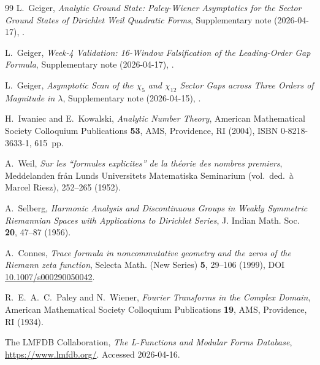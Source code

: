 \documentclass[10pt,twocolumn]{article}
\theoremstyle{definition}
\theoremstyle{remark}
\begin{document}
\begin{thebibliography}{99}
L.~Geiger,
\textit{Analytic Ground State: Paley-Wiener Asymptotics for the
Sector Ground States of Dirichlet Weil Quadratic Forms},
Supplementary note (2026-04-17),
.

L.~Geiger,
\textit{Week-4 Validation: 16-Window Falsification of the
Leading-Order Gap Formula},
Supplementary note (2026-04-17),
.

L.~Geiger,
\textit{Asymptotic Scan of the $\chi_5$ and $\chi_{12}$ Sector Gaps
across Three Orders of Magnitude in $\lambda$},
Supplementary note (2026-04-15),
.


H.~Iwaniec and E.~Kowalski,
\textit{Analytic Number Theory},
American Mathematical Society Colloquium Publications \textbf{53},
AMS, Providence, RI (2004), ISBN 0-8218-3633-1, 615~pp.

A.~Weil,
\textit{Sur les ``formules explicites'' de la th\'eorie des nombres
premiers},
Meddelanden fr\aa n Lunds Universitets Matematiska Seminarium
(vol.\ ded.\ \`a Marcel Riesz), 252--265 (1952).

A.~Selberg,
\textit{Harmonic Analysis and Discontinuous Groups in Weakly
Symmetric Riemannian Spaces with Applications to Dirichlet Series},
J. Indian Math. Soc. \textbf{20}, 47--87 (1956).

A.~Connes,
\textit{Trace formula in noncommutative geometry and the zeros of
the Riemann zeta function},
Selecta Math. (New Series) \textbf{5}, 29--106 (1999),
DOI \href{https://doi.org/10.1007/s000290050042}{10.1007/s000290050042}.

R.~E.~A.~C.~Paley and N.~Wiener,
\textit{Fourier Transforms in the Complex Domain},
American Mathematical Society Colloquium Publications \textbf{19},
AMS, Providence, RI (1934).

The LMFDB Collaboration,
\textit{The L-Functions and Modular Forms Database},
\url{https://www.lmfdb.org/}. Accessed 2026-04-16.

\end{thebibliography}
\end{document}
